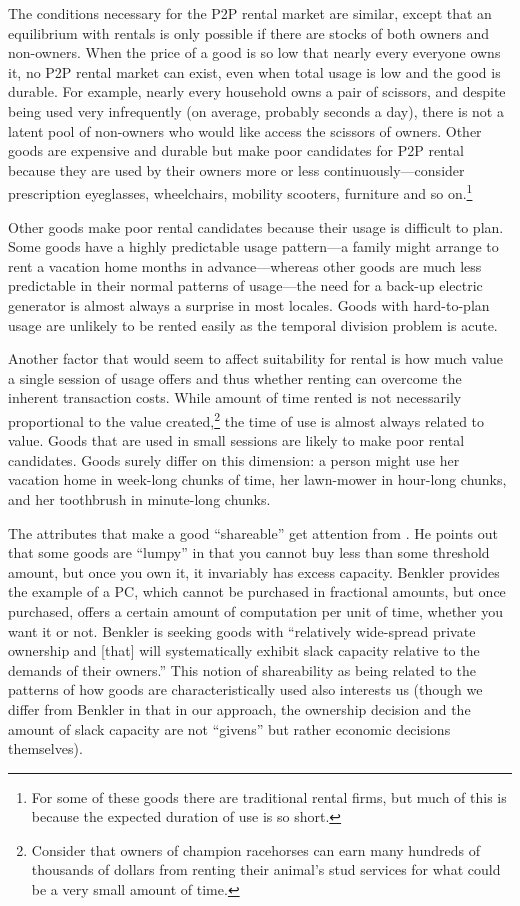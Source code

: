 \documentclass[11pt]{article}
\begin{document}
The conditions necessary for the P2P rental market are similar, except that an equilibrium with rentals is only possible if there are stocks of both owners and non-owners. 
When the price of a good is so low that nearly every everyone owns it, no P2P rental market can exist, even when total usage is low and the good is durable.
For example, nearly every household owns a pair of scissors, and despite being used very infrequently (on average, probably seconds a day), there is not a latent pool of non-owners who would like access the scissors of owners.  
Other goods are expensive and durable but make poor candidates for P2P rental because they are used by their owners more or less continuously---consider prescription eyeglasses, wheelchairs, mobility scooters, furniture and so on.\footnote{
  For some of these goods there are traditional rental firms, but much of this is because the expected duration of use is so short.  
} 

Other goods make poor rental candidates because their usage is difficult to plan. 
Some goods have a highly predictable usage pattern---a family might arrange to rent a vacation home months in advance---whereas other goods are much less predictable in their normal patterns of usage---the need for a back-up electric generator is almost always a surprise in most locales.  
Goods with hard-to-plan usage are unlikely to be rented easily as the temporal division problem is acute.

Another factor that would seem to affect suitability for rental is how much value a single session of usage offers and thus whether renting can overcome the inherent transaction costs.
While amount of time rented is not necessarily proportional to the value created,\footnote{
  Consider that owners of champion racehorses can earn many hundreds of thousands of dollars from renting their animal's stud services for what could be a very small amount of time.}  
the time of use is almost always related to value.
Goods that are used in small sessions are likely to make poor rental candidates.
Goods surely differ on this dimension: 
a person might use her vacation home in week-long chunks of time, her lawn-mower in hour-long chunks, and her toothbrush in minute-long chunks. 

The attributes that make a good ``shareable'' get attention from \cite{benkler2004sharing}.
He points out that some goods are ``lumpy'' in that you cannot buy less than some threshold amount, but once you own it, it invariably has excess capacity. 
Benkler provides the example of a PC, which cannot be purchased in fractional amounts, but once purchased, offers a certain amount of computation per unit of time, whether you want it or not. 
Benkler is seeking goods with ``relatively wide-spread private ownership and [that] will systematically exhibit slack capacity relative to the demands of their owners.''
This notion of shareability as being related to the patterns of how goods are characteristically used also interests us (though we differ from Benkler in that in our approach, the ownership decision and the amount of slack capacity are not ``givens'' but rather economic decisions themselves). 
\end{document}
